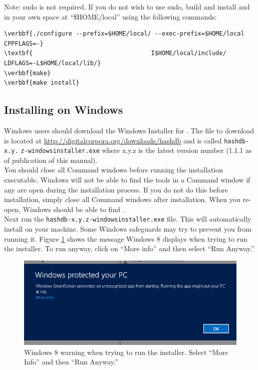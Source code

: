 \documentclass[11pt,fleqn]{article} %
\begin{document}
Note: sudo is not required. If you do not wish to use sudo,  build and install \hash and \bulk in your own space at ``\$HOME/local'' using the following commands:
\begin{Verbatim}[commandchars=\\\{\}]
\verbbf{./configure --prefix=$HOME/local/ --exec-prefix=$HOME/local CPPFLAGS=-}
\textbf{                                 I$HOME/local/include/ LDFLAGS=-L$HOME/local/lib/}
\verbbf{make}
\verbbf{make install}
\end{Verbatim}

\subsection{Installing on Windows}
\label{InstallingOnWindows}
Windows users should download the Windows Installer for \hash. The file to download is located at \url{http://digitalcorpora.org/downloads/hashdb} and is called \texttt{hashdb-x.y.} \texttt{z-windowsinstaller.exe} where x.y.z is the latest version number (1.1.1 as of publication of this manual).\\

You should close all Command windows before running the installation executable. Windows will not be able to find the \hash tools in a Command window if any are open during the installation process. If you do not do this before installation, simply close all Command windows after installation. When you re-open, Windows should be able to find \hash.\\


 Next run the \texttt{hashdb-x.y.z-windowsinstaller.exe} file. This will automatically install \hash on your machine. Some Windows safeguards may try to prevent you from running it. Figure \ref{fig:windowsWarning} shows the message Windows 8 displays when trying to run the installer. To run anyway, click on ``More info'' and then select ``Run Anyway.'' \\
\begin{figure}
	\center
	\includegraphics[scale=.5]{windowsWarning.png}
	\caption{Windows 8 warning when trying to run the installer. Select ``More Info'' and then ``Run Anyway.''}
	\label{fig:windowsWarning}
\end{figure}
\end{document}
